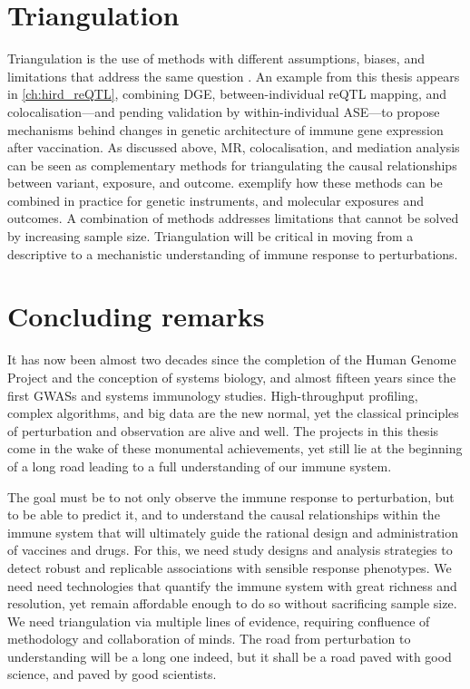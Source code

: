 \section{Triangulation}

Triangulation is the use of methods with different assumptions, biases, and limitations that address the same question \autocite{munafo2018RobustResearchNeeds}.
An example from this thesis appears in \cref{ch:hird_reQTL}, 
combining \gls{DGE}, between-individual \gls{reQTL} mapping, and colocalisation---and pending validation by within-individual \gls{ASE}---to propose mechanisms behind changes in genetic architecture of immune gene expression after vaccination.
As discussed above, \gls{MR}, colocalisation, and mediation analysis can be seen as complementary methods for triangulating the causal relationships between variant, exposure, and outcome.
\textcite{taylor2019IntegrativeAnalysisGene,zheng2019PhenomewideMendelianRandomization} exemplify how these methods can be combined in practice for genetic instruments, and molecular exposures and outcomes.
%
%
A combination of methods addresses limitations that cannot be solved by increasing sample size.
Triangulation will be critical in moving from a descriptive to a mechanistic understanding of immune response to perturbations.

\section{Concluding remarks}

It has now been almost two decades since the completion of the Human Genome Project and the conception of systems biology,
and almost fifteen years since the first \glspl{GWAS} and systems immunology studies.
High-throughput profiling, complex algorithms, and big data are the new normal,
yet the classical principles of perturbation and observation are alive and well.
The projects in this thesis come in the wake of these monumental achievements,
yet still lie at the beginning of a long road leading to a full understanding of our immune system.

The goal must be to not only observe the immune response to perturbation,
but to be able to predict it,
and to understand the causal relationships within the immune system that will ultimately guide the rational design and administration of vaccines and drugs.
For this, we need study designs and analysis strategies to detect robust and replicable associations with sensible response phenotypes.
We need need technologies that quantify the immune system with great richness and resolution, yet remain affordable enough to do so without sacrificing sample size.
We need triangulation via multiple lines of evidence, 
requiring confluence of methodology and collaboration of minds.
The road from perturbation to understanding will be a long one indeed,
but it shall be a road paved with good science,
and paved by good scientists.

